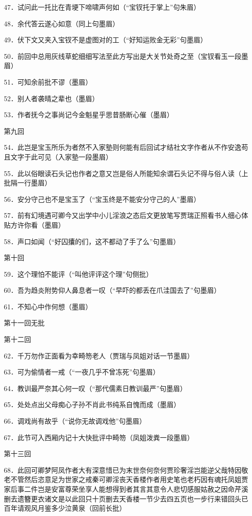 47．试问此一托比在青埂下啼啸声何如{（\kaishu ``宝钗托于掌上''句朱眉）}

48．余代答云遂心如意{（\kaishu 同上句墨眉）}

49．伏下文又夹入宝钗不是虚图对的工{（\kaishu ``好知运败金无彩''句墨眉）}

50．前回中总用灰线草蛇细细写法至此方写出是大关节处奇之至{（\kaishu 宝钗看玉一段墨眉）}

51．可知余前批不谬{（\kaishu 墨眉）}

52．别人者袭晴之辈也{（\kaishu 墨眉）}

53．作者抚今之事尚记今金魁星乎思昔肠断心催{（\kaishu 墨眉）}

第九回

54．此岂是宝玉所乐为者然不入家塾则何能有后回试才结社文字作者从不作安逸苟且文字于此可见{（\kaishu 入家塾一段墨眉）}

55．此以俗眼读石头记也作者之意又岂是俗人所能知余谓石头记不得与俗人读{（\kaishu 上批隔一行墨眉）}

56．安分守己也不是宝玉了{（\kaishu ``宝玉终是不能安分守己的人''墨眉）}

57．前有幻境遇可卿今又出学中小儿淫浪之态后文更放笔写贾瑞正照看书人细心体贴方许你看{（\kaishu 墨眉）}

58．声口如闻{（\kaishu ``好囚攮的们，这不都动了手了么''句墨眉）}

第十回

59．这个理怕不能评{（\kaishu ``叫他评评这个理''句侧批）}

60．吾为趋炎附势仰人鼻息者一叹{（\kaishu ``早吓的都丢在爪洼国去了''句墨眉）}

61．不知心中作何想{（\kaishu 墨眉）}

第十一回无批

第十二回

62．千万勿作正面看为幸畸笏老人{（\kaishu 贾瑞与凤姐对话一节墨眉）}

63．可为偷情者一戒{（\kaishu ``一夜几乎不曾冻死''句墨眉）}

64．教训最严奈其心何一叹{（\kaishu ``那代儒素日教训最严''句墨眉）}

65．处处点出父母痴心子孙不肖此书纯系自愧而成{（\kaishu 墨眉）}

66．调戏尚有故乎{（\kaishu ``说你无故调戏他''句墨眉）}

67．此节可入西厢内记十大快批评中畸笏{（\kaishu 凤姐泼粪一段墨眉）}

第十三回

68．此回可卿梦阿凤作者大有深意惜已为末世奈何奈何贾珍奢淫岂能逆父哉特因敬老不管然后恣意足为世家之戒秦可卿淫丧天香楼作者用史笔也老朽因有魂托凤姐贾家后事二件岂是安富尊荣坐享人能想得到者其言其意令人悲切感服姑赦之因命芹溪删去遗簪更衣诸文是以此回只十页删去天香楼一节少去四五页也一步行来错回头已百年请观风月鉴多少泣黄泉{（\kaishu 回前长批）}

